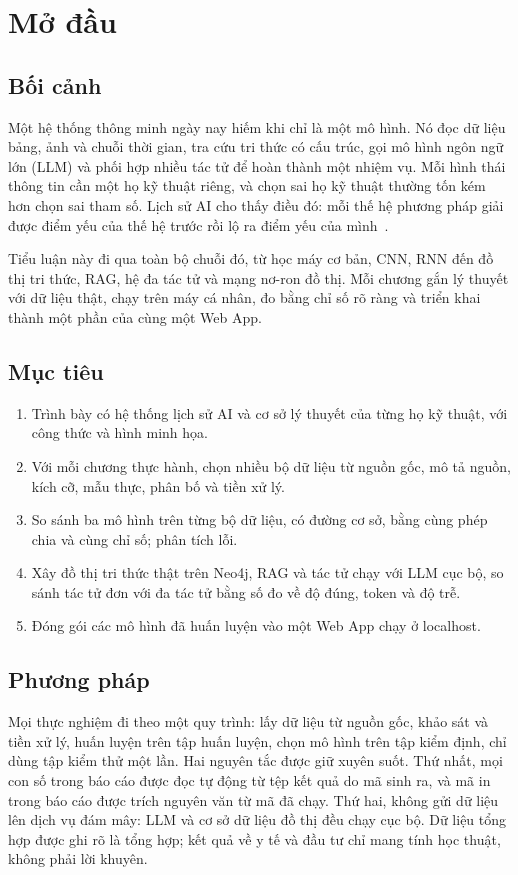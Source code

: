 \chapter*{Mở đầu}

\section*{Bối cảnh}
Một hệ thống thông minh ngày nay hiếm khi chỉ là một mô hình. Nó đọc dữ liệu bảng, ảnh và chuỗi thời gian, tra cứu tri thức có cấu trúc, gọi mô hình ngôn
ngữ lớn (LLM) và phối hợp nhiều tác tử để hoàn thành một nhiệm vụ. Mỗi hình thái thông tin cần một họ kỹ thuật riêng, và chọn sai họ kỹ thuật thường tốn kém hơn
chọn sai tham số. Lịch sử AI cho thấy điều đó: mỗi thế hệ phương pháp giải được điểm yếu của thế hệ trước rồi lộ ra điểm yếu của mình~\cite{ch1:nilsson2010}.

Tiểu luận này đi qua toàn bộ chuỗi đó, từ học máy cơ bản, CNN, RNN đến đồ thị tri thức, RAG, hệ đa tác tử và mạng nơ-ron đồ thị. Mỗi chương gắn lý thuyết với dữ liệu
thật, chạy trên máy cá nhân, đo bằng chỉ số rõ ràng và triển khai thành một phần của cùng một Web App.

\section*{Mục tiêu}
\begin{enumerate}
  \item Trình bày có hệ thống lịch sử AI và cơ sở lý thuyết của từng họ kỹ thuật, với công thức và hình minh họa.
  \item Với mỗi chương thực hành, chọn nhiều bộ dữ liệu từ nguồn gốc, mô tả nguồn, kích cỡ, mẫu thực, phân bố và tiền xử lý.
  \item So sánh ba mô hình trên từng bộ dữ liệu, có đường cơ sở, bằng cùng phép chia và cùng chỉ số; phân tích lỗi.
  \item Xây đồ thị tri thức thật trên Neo4j, RAG và tác tử chạy với LLM cục bộ, so sánh tác tử đơn với đa tác tử bằng số đo về độ đúng, token và độ trễ.
  \item Đóng gói các mô hình đã huấn luyện vào một Web App chạy ở localhost.
\end{enumerate}

\section*{Phương pháp}
Mọi thực nghiệm đi theo một quy trình: lấy dữ liệu từ nguồn gốc, khảo sát và tiền xử lý, huấn luyện trên tập huấn luyện, chọn mô hình trên tập kiểm định, chỉ dùng tập kiểm thử một
lần. Hai nguyên tắc được giữ xuyên suốt. Thứ nhất, mọi con số trong báo cáo được đọc tự động từ tệp kết quả do mã sinh ra, và mã in trong báo cáo được trích nguyên văn từ mã đã chạy.
Thứ hai, không gửi dữ liệu lên dịch vụ đám mây: LLM và cơ sở dữ liệu đồ thị đều chạy cục bộ. Dữ liệu tổng hợp được ghi rõ là tổng hợp; kết quả về y tế và đầu tư chỉ mang tính học thuật,
không phải lời khuyên.

